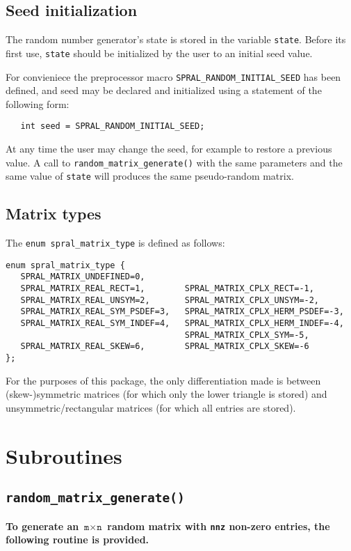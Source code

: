 \subsection{Seed initialization}
\label{random_matrix: seed initialization}
The random number generator's state is stored in the variable {\tt state}.
Before its first use, {\tt state} should be initialized by the user to an
initial seed value.

For convieniece the preprocessor macro \texttt{SPRAL\_RANDOM\_INITIAL\_SEED} has
been defined, and seed may be declared and initialized using a statement of the
following form:
\begin{verbatim}
   int seed = SPRAL_RANDOM_INITIAL_SEED;
\end{verbatim}

At any time the user may change the seed, for example to restore a previous
value. A call to \texttt{random\_matrix\_generate()} with the same parameters
and the same value of \texttt{state} will produces the same pseudo-random
matrix.

\subsection{Matrix types}
\label{random_matrix: matrix types}
The \texttt{enum spral\_matrix\_type} is defined as follows:
\begin{verbatim}
enum spral_matrix_type {
   SPRAL_MATRIX_UNDEFINED=0,
   SPRAL_MATRIX_REAL_RECT=1,        SPRAL_MATRIX_CPLX_RECT=-1,
   SPRAL_MATRIX_REAL_UNSYM=2,       SPRAL_MATRIX_CPLX_UNSYM=-2,
   SPRAL_MATRIX_REAL_SYM_PSDEF=3,   SPRAL_MATRIX_CPLX_HERM_PSDEF=-3,
   SPRAL_MATRIX_REAL_SYM_INDEF=4,   SPRAL_MATRIX_CPLX_HERM_INDEF=-4,
                                    SPRAL_MATRIX_CPLX_SYM=-5,
   SPRAL_MATRIX_REAL_SKEW=6,        SPRAL_MATRIX_CPLX_SKEW=-6
};
\end{verbatim}

For the purposes of this package, the only differentiation made is between
(skew-)symmetric matrices (for which only the lower triangle is stored) and
unsymmetric/rectangular matrices (for which all entries are stored).


\section{Subroutines}

\subsection{\texttt{random\_matrix\_generate()}}
\textbf{
   To generate an $\texttt{m}\times \texttt{n}$ random matrix with \texttt{nnz}
non-zero entries, the following routine is provided.
}

